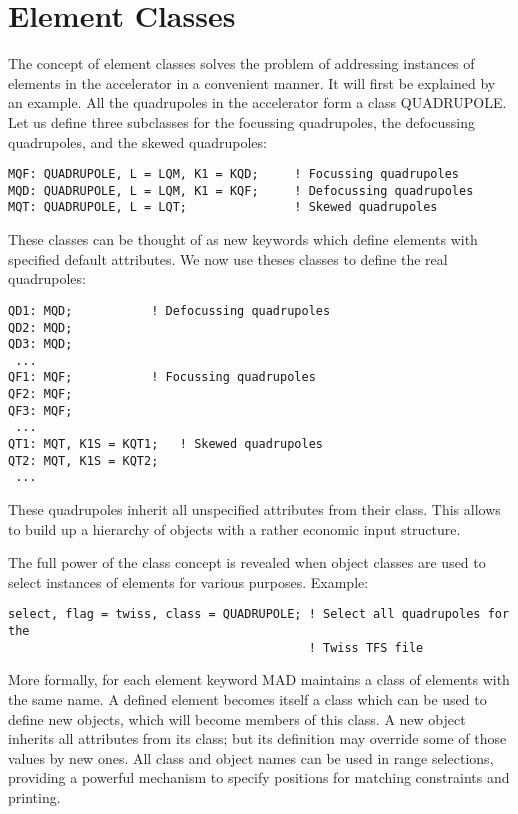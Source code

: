 
\section{Element Classes}  
\label{sec:element_classes}
The concept of element classes solves the problem of addressing
instances of elements in the accelerator in a convenient manner. It will
first be explained by an example. All the quadrupoles in the accelerator
form a class QUADRUPOLE. Let us define three subclasses for the
focussing quadrupoles, the defocussing quadrupoles, and the skewed
quadrupoles:  
\begin{verbatim}
MQF: QUADRUPOLE, L = LQM, K1 = KQD;     ! Focussing quadrupoles
MQD: QUADRUPOLE, L = LQM, K1 = KQF;     ! Defocussing quadrupoles
MQT: QUADRUPOLE, L = LQT;               ! Skewed quadrupoles
\end{verbatim} 

These classes can be thought of as new keywords which define elements
with specified default attributes. We now use theses classes to define
the real quadrupoles:  
\begin{verbatim}
QD1: MQD;           ! Defocussing quadrupoles
QD2: MQD;
QD3: MQD;
 ...
QF1: MQF;           ! Focussing quadrupoles
QF2: MQF;
QF3: MQF;
 ...
QT1: MQT, K1S = KQT1;   ! Skewed quadrupoles
QT2: MQT, K1S = KQT2;
 ...
\end{verbatim} 

These quadrupoles inherit all unspecified attributes from their
class. This allows to build up a hierarchy of objects with a rather
economic input structure.  

The full power of the class concept is revealed when object classes are
used to select instances of elements for various purposes. Example:  
\begin{verbatim}
select, flag = twiss, class = QUADRUPOLE; ! Select all quadrupoles for the
                                          ! Twiss TFS file
\end{verbatim}

More formally, for each element keyword MAD maintains a class of
elements with the same name. A defined element becomes itself a class
which can be used to define new objects, which will become members of
this class. A new object inherits all attributes from its class; but its
definition may override some of those values by new ones. All class and
object names can be used in range selections, providing a powerful
mechanism to specify positions for matching constraints and printing.  

